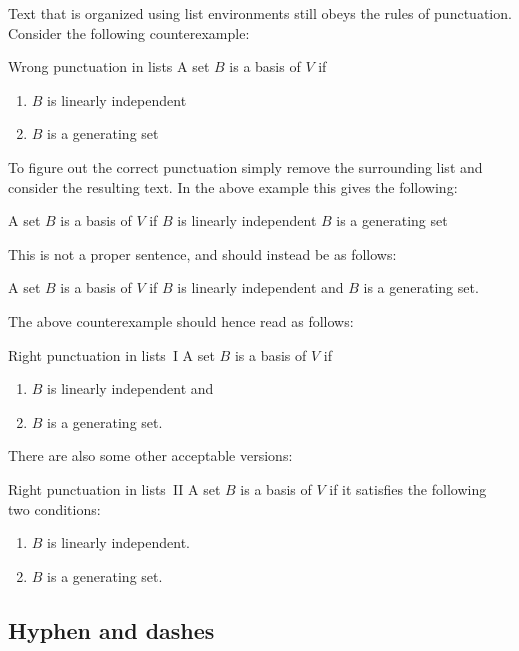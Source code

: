 Text that is organized using list environments still obeys the rules of punctuation.
Consider the following counterexample:
\begin{showlatex}{Wrong punctuation in lists}
  A set $B$ is a basis of $V$ if
  \begin{enumerate}
    \item
      $B$ is linearly independent
    \item
      $B$ is a generating set
  \end{enumerate}
\end{showlatex}
To figure out the correct punctuation simply remove the surrounding list and consider the resulting text.
In the above example this gives the following:
\begin{center}
  A set $B$ is a basis of $V$ if $B$ is linearly independent $B$ is a generating set
\end{center}
This is not a proper sentence, and should instead be as follows:
\begin{center}
  A set $B$ is a basis of $V$ if $B$ is linearly independent and $B$ is a generating set.
\end{center}
The above counterexample should hence read as follows:
\begin{showlatex}{Right punctuation in lists~I}
  A set $B$ is a basis of $V$ if
  \begin{enumerate}
    \item
      $B$ is linearly independent and
    \item
      $B$ is a generating set.
  \end{enumerate}
\end{showlatex}
There are also some other acceptable versions:
\begin{showlatex}{Right punctuation in lists~II}
  A set $B$ is a basis of $V$ if it satisfies the following two conditions:
  \begin{enumerate}
    \item
      $B$ is linearly independent.
    \item
      $B$ is a generating set.
  \end{enumerate}
\end{showlatex}




\subsection{Hyphen and dashes}

